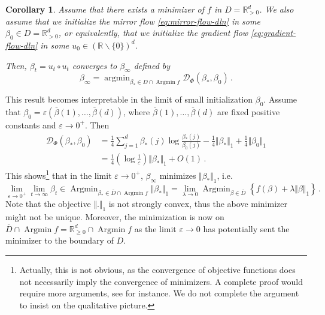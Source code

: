 \documentclass[11pt,reqno]{article}
\DeclareMathOperator*{\argmin}{argmin}
\DeclareMathOperator*{\Argmin}{Argmin}
\newcommand{\R}{\mathbb{R}}
\newcommand{\cD}{\mathcal{D}}
\renewcommand{\geq}{\geqslant}
\numberwithin{equation}{section}
\theoremstyle{plain}
\newtheorem{coro}[assumption]{Corollary}
\theoremstyle{definition}
\theoremstyle{remark}
\begin{document}
\begin{coro}
	\label{coro:implicit-reg-dln}
	Assume that there exists a minimizer of $f$ in $D = \R^d_{>0}$. We also assume that we initialize the mirror flow \eqref{eq:mirror-flow-dln} in some $\beta_0 \in D = \R^d_{>0}$, or equivalently, that we initialize the gradient flow \eqref{eq:gradient-flow-dln} in some $u_0 \in (\R \backslash \{0\})^d$. 

	Then, $\beta_t = u_t \circ u_t$ converges to $\beta_\infty$ defined by 
	\begin{equation*}
		\beta_\infty = \argmin_{\beta_* \in D \cap \Argmin f} \cD_\Phi(\beta_*, \beta_0) \, .
	\end{equation*}
\end{coro}
This result becomes interpretable in the limit of small initialization $\beta_0$. Assume that $\beta_0 = \varepsilon (\overline{\beta}(1), \dots, \overline{\beta}(d))$, where $\overline{\beta}(1), \dots, \overline{\beta}(d)$ are fixed positive constants and $\varepsilon \to 0^+$. Then 
\begin{align*}
	\cD_\Phi(\beta_*, \beta_0) &= \frac{1}{4}\sum_{j=1}^{d} \beta_*(j) \log \frac{\beta_*(j)}{\beta_0(j)} - \frac{1}{4 } \Vert \beta_* \Vert_1 + \frac{1}{4} \Vert \beta_0 \Vert_1 \\
	&= \frac{1}{4}\left(\log \frac{1}{\varepsilon}\right) \Vert \beta_* \Vert_1  + O(1) \, .
\end{align*}
This shows\footnote{Actually, this is not obvious, as the convergence of objective functions does not necessarily imply the convergence of minimizers. A complete proof would require more arguments, see \cite{attouch1996viscosity} for instance. We do not complete the argument to insist on the qualitative picture.} that in the limit $\varepsilon \to 0^+$, $\beta_\infty$ minimizes $ \Vert \beta_* \Vert_1$, i.e.
\begin{equation}
	\label{eq:min-l1-u2}
	\lim_{\varepsilon \to 0^+} \lim_{t \to \infty} \beta_t \in \Argmin_{\beta_* \in \overline{D} \cap \Argmin f} \Vert \beta_* \Vert_1 = \lim_{\lambda \to 0} \Argmin_{\beta \in \overline{D}} \left\{ f(\beta) + \lambda \Vert \beta \Vert_1 \right\} \, .
\end{equation}
Note that the objective $\Vert . \Vert_1$ is not strongly convex, thus the above minimizer might not be unique. Moreover, the minimization is now on $\overline{D} \cap \Argmin f = \R_{\geq 0}^d\cap \Argmin f$ as the limit $\varepsilon\to 0$ has potentially sent the minimizer to the boundary of $D$. 
\end{document}
